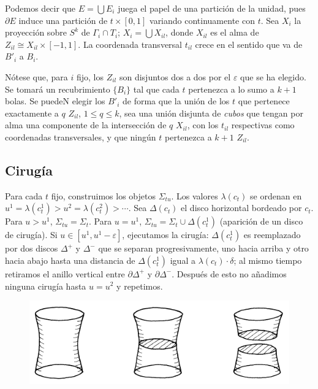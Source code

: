 \documentclass[twoside, 11pt]{article}
\begin{document}
Podemos decir que $E=\bigcup E_i$ juega el papel de una partición de la unidad, pues $\partial E$ induce una partición de $t\times [0,1]$ variando continuamente con $t$. Sea $X_i$ la proyección sobre $S^k$ de $\Gamma_i\cap T_i$; $X_i=\bigcup X_{il}$, donde $X_{il}$ es el alma de $Z_{il}\cong X_{il}\times [-1,1]$. La coordenada transversal $t_{il}$ crece en el sentido que va de $B'_i$ a $B_i$. 

Nótese que, para $i$ fijo, los $Z_{il}$ son disjuntos dos a dos por el $\varepsilon$ que se ha elegido. Se tomará un recubrimiento $\{B_i\}$ tal que cada $t$ pertenezca a lo sumo a $k+1$ bolas. Se puedeN elegir los $B'_i$ de forma que la unión de los $t$ que pertenece exactamente a $q$ $Z_{il}$, $1\leq q\leq k$, sea una unión disjunta de \emph{cubos} que tengan por alma una componente de la intersección de $q$ $X_{il}$, con los $t_{il}$ respectivas como coordenadas transversales, y que ningún $t$ pertenezca a $k+1$ $Z_{il}$. 

\subsection{Cirugía}
Para cada $t$ fijo, construimos los objetos $\Sigma_{tu}$. Los valores $\lambda(c_t)$ se ordenan en $u^1=\lambda(c_t^1)>u^2=\lambda(c_t^2)>\cdots$. Sea $\Delta(c_t)$ el disco horizontal bordeado por $c_t$. Para $u>u^1$, $\Sigma_{tu}=\Sigma_t$. Para $u=u^1$, $\Sigma_{tu}=\Sigma_t\cup \Delta(c_t^1)$ (aparición de un disco de cirugía). Si $u\in[u^1, u^1-\varepsilon]$, ejecutamos la cirugía: $\Delta(c_t^1)$ es reemplazado por dos discos $\Delta^+$ y $\Delta^-$ que se separan progresivamente, uno hacia arriba y otro hacia abajo hasta una distancia de $\Delta(c_t^1)$ igual a $\lambda(c_t)\cdot\delta$; al mismo tiempo retiramos el anillo vertical entre $\partial\Delta^+$ y $\partial\Delta^-$. Después de esto no añadimos ninguna cirugía hasta $u=u^2$ y repetimos. 

\begin{figure}[h!]
\includegraphics[scale=0.6]{cirugia}
\end{figure}
\end{document}
